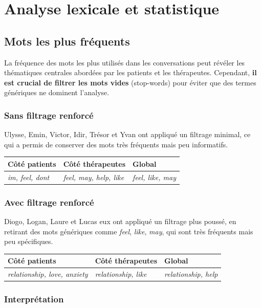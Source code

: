 \documentclass[12pt,a4paper]{report}
\begin{document}
\chapter{Analyse lexicale et statistique}

\section{Mots les plus fréquents}
La fréquence des mots les plus utilisés dans les conversations peut révéler les thématiques centrales abordées par les patients et les thérapeutes.
Cependant, \textbf{il est crucial de filtrer les mots vides} (stop-words) pour éviter que des termes génériques ne dominent l'analyse.
\subsection{Sans filtrage renforcé}
Ulysse, Emin, Victor, Idir, Trésor et Yvan ont appliqué un filtrage minimal, ce qui a permis de conserver des mots très fréquents mais peu informatifs.
\begin{center}
\begin{tabular}{lll}
\toprule
\textbf{Côté patients} & \textbf{Côté thérapeutes} & \textbf{Global} \\
\midrule
\textit{im, feel, dont} & \textit{feel, may, help, like} & \textit{feel, like, may} \\
\bottomrule
\end{tabular}
\end{center}

\subsection{Avec filtrage renforcé}
Diogo, Logan, Laure et Lucas eux ont appliqué un filtrage plus poussé, en retirant des mots génériques comme \textit{feel}, \textit{like}, \textit{may}, qui sont très fréquents mais peu spécifiques.
\begin{center}
\begin{tabular}{lll}
\toprule
\textbf{Côté patients} & \textbf{Côté thérapeutes} & \textbf{Global} \\
\midrule
\textit{relationship, love, anxiety} & \textit{relationship, like} & \textit{relationship, help} \\
\bottomrule
\end{tabular}
\end{center}

\subsection{Interprétation}
\end{document}
